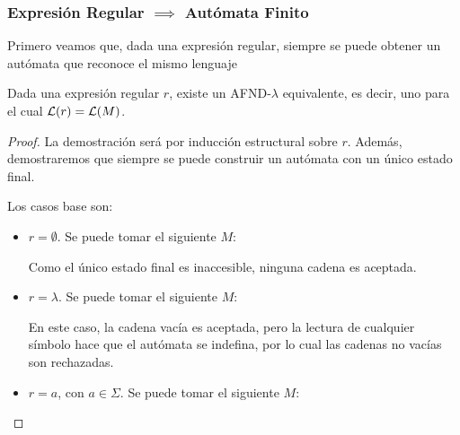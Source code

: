 \subsubsection{Expresión Regular $\implies$ Autómata Finito}

Primero veamos que, dada una expresión regular, siempre se puede obtener un autómata que reconoce el mismo lenguaje

\begin{theorem*}
    Dada una expresión regular $r$, existe un AFND-$\lambda$ equivalente, es decir, uno para el cual $\mathcal{L}(r) = \mathcal{L}(M)$.
\end{theorem*}
\begin{proof}
    La demostración será por inducción estructural sobre $r$. Además, demostraremos que siempre se puede construir un autómata con un único estado final.

    Los casos base son:
    \begin{itemize}
        \item $r = \emptyset$. Se puede tomar el siguiente $M$:
              \begin{figure}[H]
                  \centering
              \end{figure}

              Como el único estado final es inaccesible, ninguna cadena es aceptada.
        \item $r = \lambda$. Se puede tomar el siguiente $M$:
              \begin{figure}[H]
                  \centering
              \end{figure}

              En este caso, la cadena vacía es aceptada, pero la lectura de cualquier símbolo hace que el autómata se indefina, por lo cual las cadenas no vacías son rechazadas.
        \item $r = a$, con $a \in \Sigma$. Se puede tomar el siguiente $M$:
              \begin{figure}[H]
                  \centering
\end{figure}
\end{itemize}
\end{proof}
